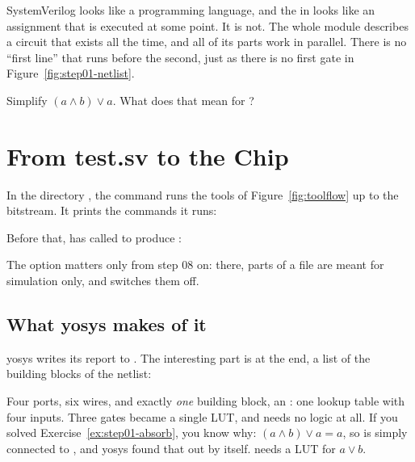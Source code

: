 \begin{pitfall}
SystemVerilog looks like a programming language, and the \cc{=} in
 looks like an assignment that is executed at some point. It is
not. The whole module describes a circuit that exists all the time, and all of
its parts work in parallel. There is no ``first line'' that runs before the
second, just as there is no first gate in Figure~\ref{fig:step01-netlist}.
\end{pitfall}

\begin{exercise}
\label{ex:step01-absorb}
Simplify $(a \wedge b) \vee a$. What does that mean for ?
\end{exercise}

\section{From test.sv to the Chip}
\label{sec:step01-synth}

In the directory , the command  runs the
tools of Figure~\ref{fig:toolflow} up to the bitstream. It prints the
commands it runs:


Before that,  has called  to produce :


The option  matters only from step 08 on: there, parts
of a file are meant for simulation only, and  switches them off.

\subsection*{What yosys makes of it}
\label{sec:step01-yosys}

yosys writes its report to . The interesting part is at the end, a
list of the building blocks of the netlist:


Four ports, six wires, and exactly \emph{one} building block, an
: one lookup table with four inputs. Three gates became a single
LUT, and  needs no logic at all. If you solved
Exercise~\ref{ex:step01-absorb}, you know why: $(a \wedge b) \vee a = a$, so
 is simply connected to , and yosys found that out by itself.
 needs a LUT for $a \vee b$.

